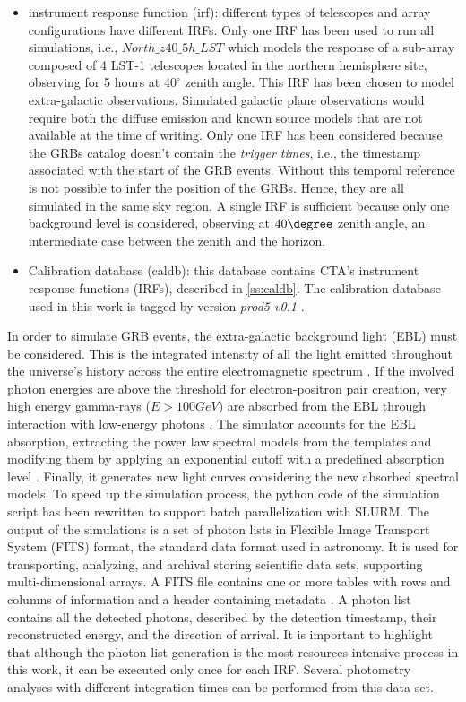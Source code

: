 \begin{itemize}
    \item instrument response function (irf): different types of telescopes and array configurations have different IRFs. Only one IRF has been used to run all simulations, i.e., $North\_z40\_5h\_LST$ which models the response of a sub-array composed of 4 LST-1 telescopes located in the northern hemisphere site, observing for 5 hours at $40^{\circ}$ zenith angle. This IRF has been chosen to model extra-galactic observations. Simulated galactic plane observations would require both the diffuse emission and known source models that are not available at the time of writing. Only one IRF has been considered because the GRBs catalog doesn't contain the \textit{trigger times}, i.e., the timestamp associated with the start of the GRB events. Without this temporal reference is not possible to infer the position of the GRBs. Hence, they are all simulated in the same sky region. A single IRF is sufficient because only one background level is considered, observing at $40\degree$  zenith angle, an intermediate case between the zenith and the horizon.
    \item Calibration database (caldb): this database contains CTA's instrument response functions (IRFs), described in \autoref{ss:caldb}. The calibration database used in this work is tagged by version \textit{prod5 v0.1} \cite{zenodo_2021}.
\end{itemize}
In order to simulate GRB events, the extra-galactic background light (EBL) must be considered. This is the integrated intensity of all the light emitted throughout the universe's history across the entire electromagnetic spectrum \cite{Cooray_2016}. 
If the involved photon energies are above the threshold for electron-positron pair creation, very high energy gamma-rays ($E >100 GeV$) are absorbed from the EBL through interaction with low-energy photons \cite{Mazin_2013}. The simulator \cite{dipiano2022ctasagsci} accounts for the EBL absorption, extracting the power law spectral models from the templates and modifying them by applying an exponential cutoff with a predefined absorption level \cite{Gilmore_2012}. Finally, it generates new light curves considering the new absorbed spectral models. 
To speed up the simulation process, the python code of the simulation script has been rewritten to support batch parallelization with SLURM. The output of the simulations is a set of photon lists in Flexible Image Transport System (FITS) format, the standard data format used in astronomy. It is used for transporting, analyzing, and archival storing scientific data sets, supporting multi-dimensional arrays. A FITS file contains one or more tables with rows and columns of information and a header containing metadata \cite{fitswebsite}. A photon list contains all the detected photons, described by the detection timestamp, their reconstructed energy, and the direction of arrival.
It is important to highlight that although the photon list generation is the most resources intensive process in this work, it can be executed only once for each IRF. Several photometry analyses with different integration times can be performed from this data set.


